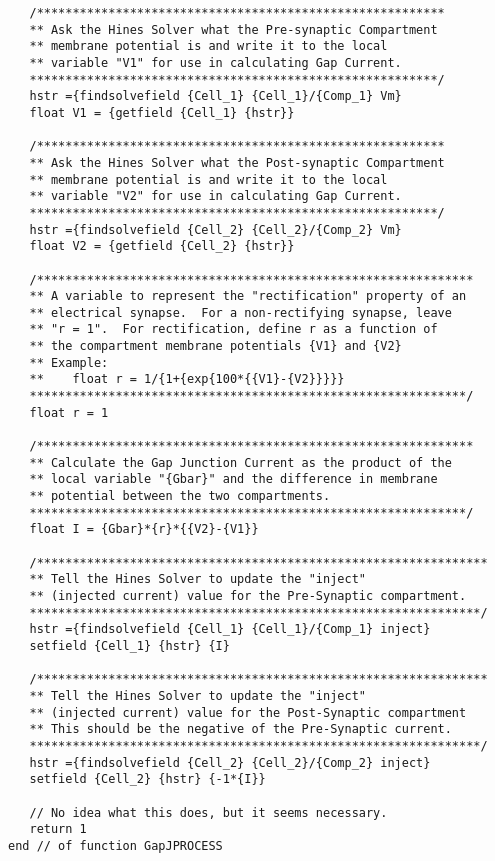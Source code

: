 \documentclass[12pt]{article}
\begin{document}
\begin{small}
\begin{verbatim}
   /*********************************************************
   ** Ask the Hines Solver what the Pre-synaptic Compartment
   ** membrane potential is and write it to the local
   ** variable "V1" for use in calculating Gap Current.
   *********************************************************/
   hstr ={findsolvefield {Cell_1} {Cell_1}/{Comp_1} Vm}
   float V1 = {getfield {Cell_1} {hstr}}

   /*********************************************************
   ** Ask the Hines Solver what the Post-synaptic Compartment
   ** membrane potential is and write it to the local
   ** variable "V2" for use in calculating Gap Current.
   *********************************************************/
   hstr ={findsolvefield {Cell_2} {Cell_2}/{Comp_2} Vm}
   float V2 = {getfield {Cell_2} {hstr}}
   
   /*************************************************************
   ** A variable to represent the "rectification" property of an
   ** electrical synapse.  For a non-rectifying synapse, leave
   ** "r = 1".  For rectification, define r as a function of
   ** the compartment membrane potentials {V1} and {V2}
   ** Example:
   **    float r = 1/{1+{exp{100*{{V1}-{V2}}}}}
   *************************************************************/
   float r = 1

   /*************************************************************
   ** Calculate the Gap Junction Current as the product of the
   ** local variable "{Gbar}" and the difference in membrane
   ** potential between the two compartments.
   *************************************************************/
   float I = {Gbar}*{r}*{{V2}-{V1}}

   /***************************************************************
   ** Tell the Hines Solver to update the "inject"
   ** (injected current) value for the Pre-Synaptic compartment.
   ***************************************************************/
   hstr ={findsolvefield {Cell_1} {Cell_1}/{Comp_1} inject}
   setfield {Cell_1} {hstr} {I}

   /***************************************************************
   ** Tell the Hines Solver to update the "inject"
   ** (injected current) value for the Post-Synaptic compartment
   ** This should be the negative of the Pre-Synaptic current.
   ***************************************************************/
   hstr ={findsolvefield {Cell_2} {Cell_2}/{Comp_2} inject}
   setfield {Cell_2} {hstr} {-1*{I}}

   // No idea what this does, but it seems necessary.
   return 1
end // of function GapJPROCESS


\end{verbatim}
\end{small}
\end{document}
